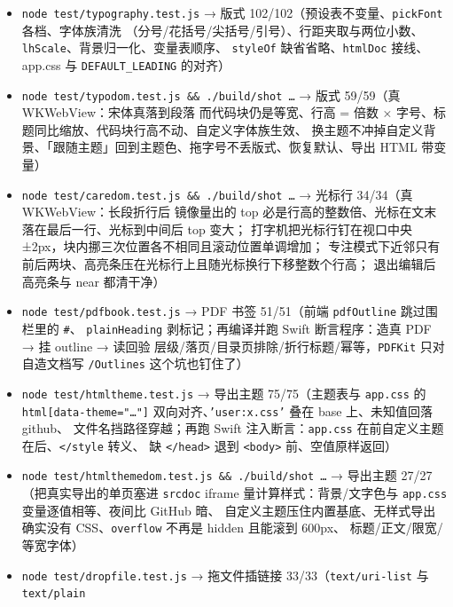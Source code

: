 \documentclass[11pt,a4paper]{ctexart}
\begin{document}
\begin{itemize}
纯中文段不标、计算样式是 \texttt{underline wavy} 且 \texttt{skip-ink:none}、颜色取主题变量、
请求去重且重画不再问引擎、每个波浪线的块内偏移都精确命中 raw、编辑块不重复画、
右键菜单给建议词、点一下只改那一处（同词出现两次也不串）、忽略后不再标且不影响别的词）
\item \texttt{node test/typography.test.js} → 版式 102/102（预设表不变量、\texttt{pickFont} 各档、字体族清洗
（分号/花括号/尖括号/引号）、行距夹取与两位小数、\texttt{lhScale}、背景归一化、变量表顺序、
\texttt{styleOf} 缺省省略、\texttt{htmlDoc} 接线、app.css 与 \texttt{DEFAULT\_LEADING} 的对齐）
\item \texttt{node test/typodom.test.js \&\& ./build/shot …} → 版式 59/59（真 WKWebView：宋体真落到段落
而代码块仍是等宽、行高 = 倍数 × 字号、标题同比缩放、代码块行高不动、自定义字体族生效、
换主题不冲掉自定义背景、「跟随主题」回到主题色、拖字号不丢版式、恢复默认、导出 HTML 带变量）
\item \texttt{node test/caredom.test.js \&\& ./build/shot …} → 光标行 34/34（真 WKWebView：长段折行后
镜像量出的 top 必是行高的整数倍、光标在文末落在最后一行、光标到中间后 top 变大；
打字机把光标行钉在视口中央 ±2px，块内挪三次位置各不相同且滚动位置单调增加；
专注模式下近邻只有前后两块、高亮条压在光标行上且随光标换行下移整数个行高；
退出编辑后高亮条与 near 都清干净）
\item \texttt{node test/pdfbook.test.js} → PDF 书签 51/51（前端 \texttt{pdfOutline} 跳过围栏里的 \texttt{\#}、
\texttt{plainHeading} 剥标记；再编译并跑 Swift 断言程序：造真 PDF → 挂 outline → 读回验
层级/落页/目录页排除/折行标题/幂等，\texttt{PDFKit} 只对自造文档写 \texttt{/Outlines} 这个坑也钉住了）
\item \texttt{node test/htmltheme.test.js} → 导出主题 75/75（主题表与 \texttt{app.css} 的
\texttt{html[data-theme="…"]} 双向对齐、\texttt{'user:x.css'} 叠在 base 上、未知值回落 github、
文件名挡路径穿越；再跑 Swift 注入断言：\texttt{app.css} 在前自定义主题在后、\texttt{\textless{}/style} 转义、
缺 \texttt{\textless{}/head\textgreater{}} 退到 \texttt{\textless{}body\textgreater{}} 前、空值原样返回）
\item \texttt{node test/htmlthemedom.test.js \&\& ./build/shot …} → 导出主题 27/27（把真实导出的单页塞进
\texttt{srcdoc} iframe 量计算样式：背景/文字色与 \texttt{app.css} 变量逐值相等、夜间比 GitHub 暗、
自定义主题压住内置基底、无样式导出确实没有 CSS、\texttt{overflow} 不再是 hidden 且能滚到 600px、
标题/正文/限宽/等宽字体）
\item \texttt{node test/dropfile.test.js} → 拖文件插链接 33/33（\texttt{text/uri-list} 与 \texttt{text/plain}

\end{itemize}
\end{document}
